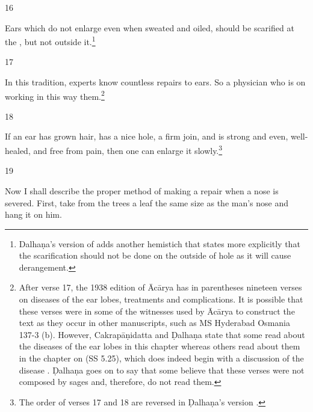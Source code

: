 \begin{translation}
\item[16]
        \begin{sloka}
Ears which do not enlarge even when sweated and oiled,  should be scarified  at the
, but not outside it.\footnote{Dalhaṇa's version of
     adds another hemistich that states more explicitly that the
    scarification should not be done on the outside of hole as it will cause
    derangement.}
        \end{sloka}
    
\item[17]
          \begin{sloka}
    In this tradition, experts know countless repairs to ears.  So a 
    physician who is  on working in this way 
     them.\footnote{After verse 17, the 1938 edition of Ācārya 
    \citep[80]{vulgate} has in parentheses nineteen verses on diseases of the ear lobes, 
    treatments and complications. It is possible that these verses were in some of the 
    witnesses used by Ācārya to construct the text as they occur in other manuscripts, such as  
    MS Hyderabad Osmania 137-3 (b). However, Cakrapāṇidatta \citep[132]{acar-1939} and 
    Ḍalhaṇa \citep[80]{vulgate} state that some read about the diseases of the ear lobes in 
    this chapter whereas others read about them in the chapter on 
     (SS 5.25), which does indeed begin with a 
    discussion of the disease .  Ḍalhaṇa goes on to say that some believe that 
    these verses were not composed by sages and, therefore, do not read them.}
        \end{sloka}
    
\item[18]
           \begin{sloka}
    If an ear has grown hair, has a nice hole, a firm join, and is strong and
    even, well-healed, and free from pain, then one can enlarge it slowly.\footnote{The order of verses 17 and 18 are reversed in Ḍalhaṇa's version \citep[80]{vulgate}.}
        \end{sloka}
    
\item[19]
    
   \begin{sloka}
        Now I shall describe the proper method of making a repair when a nose is severed.
    First, take from the trees a leaf the same size as the man's nose and hang it
    on him. 
   \end{sloka}
    

\end{translation}
